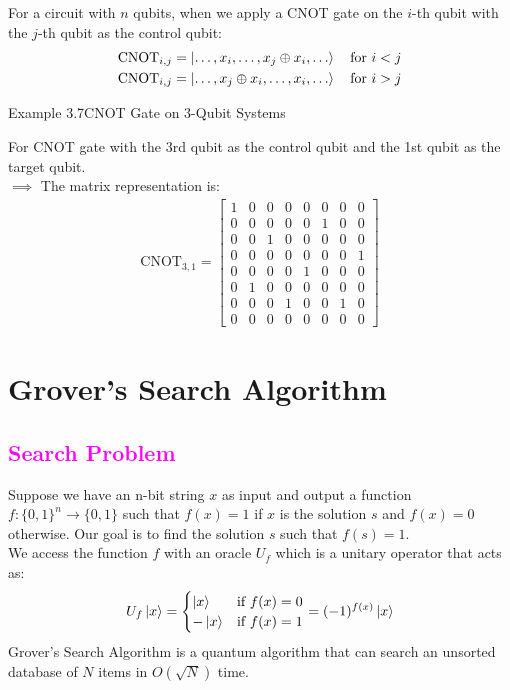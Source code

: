 \documentclass{book}
\begin{document}
For a circuit with $n$ qubits, when we apply a CNOT gate on the $i$-th qubit with the $j$-th qubit as the control qubit:
\begin{align*}
    \text{CNOT}_{i, j} &= \ket{\ldots, x_i, \ldots, x_j \oplus x_i, \ldots} \quad \text{for } i < j\\
    \text{CNOT}_{i, j} &= \ket{\ldots, x_j \oplus x_i, \ldots, x_i, \ldots} \quad \text{for } i > j
\end{align*}
\begin{egBox}{Example 3.7}{CNOT Gate on 3-Qubit Systems}
    \raggedright
    For CNOT gate with the 3rd qubit as the control qubit and the 1st qubit as the target qubit.\\
    $\implies$ The matrix representation is:
    \begin{align*}
        \text{CNOT}_{3, 1} = \begin{bmatrix} 1 & 0 & 0 & 0 & 0 & 0 & 0 & 0 \\ 0 & 0 & 0 & 0 & 0 & 1 & 0 & 0 \\ 0 & 0 & 1 & 0 & 0 & 0 & 0 & 0 \\ 0 & 0 & 0 & 0 & 0 & 0 & 0 & 1 \\ 0 & 0 & 0 & 0 & 1 & 0 & 0 & 0 \\ 0 & 1 & 0 & 0 & 0 & 0 & 0 & 0 \\ 0 & 0 & 0 & 1 & 0 & 0 & 1 & 0 \\ 0 & 0 & 0 & 0 & 0 & 0 & 0 & 0 \end{bmatrix}
    \end{align*}
\end{egBox}


\chapter{Grover's Search Algorithm}
\textcolor{magenta}{\section{\textbf{Search Problem}}}
Suppose we have an n-bit string $x$ as input and output a function $f:\{0, 1\}^n \rightarrow \{0, 1\}$ such that $f(x) = 1$ if $x$ is the solution $s$ and $f(x) = 0$ otherwise. Our goal is to find the solution $s$ such that $f(s) = 1$.\\
\vspace{2mm}
We access the function $f$ with an oracle $U_f$ which is a unitary operator that acts as:
\begin{align*}
    U_f\ket{x} = \begin{cases}
        \ket{x} & \text{if } f(x) = 0\\
        -\ket{x} & \text{if } f(x) = 1
    \end{cases} = (-1)^{f(x)}\ket{x}
\end{align*}
Grover's Search Algorithm is a quantum algorithm that can search an unsorted database of $N$ items in $O(\sqrt{N})$ time.
\end{document}
